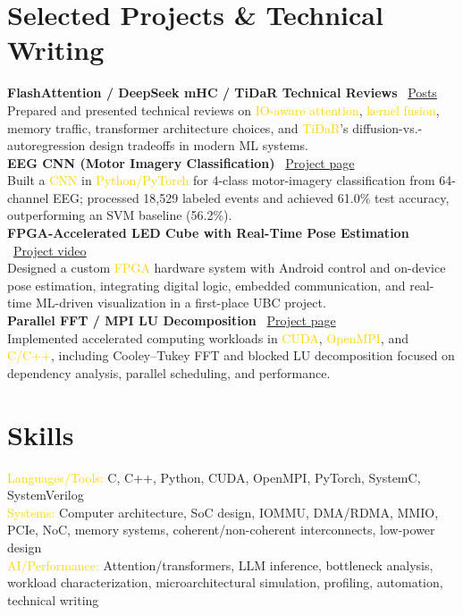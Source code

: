 \documentclass[11pt]{article}
\newcommand{\gold}[1]{\textcolor{gold}{#1}}
\begin{document}
\section{Selected Projects \& Technical Writing}
\textbf{FlashAttention / DeepSeek mHC / TiDaR Technical Reviews} \textbar\ \href{https://mauer4.github.io/post/}{Posts}\\
Prepared and presented technical reviews on \gold{IO-aware attention}, \gold{kernel fusion}, memory traffic, transformer architecture choices, and \gold{TiDaR}'s diffusion-vs.-autoregression design tradeoffs in modern ML systems.\\
\textbf{EEG CNN (Motor Imagery Classification)} \textbar\ \href{https://mauer4.github.io/project/eeg_cnn/}{Project page}\\
Built a \gold{CNN} in \gold{Python/PyTorch} for 4-class motor-imagery classification from 64-channel EEG; processed 18,529 labeled events and achieved 61.0\% test accuracy, outperforming an SVM baseline (56.2\%).\\
\textbf{FPGA-Accelerated LED Cube with Real-Time Pose Estimation} \textbar\ \href{https://www.youtube.com/watch?v=kbrSmiwQhu4&ab_channel=AdinMauer}{Project video}\\
Designed a custom \gold{FPGA} hardware system with Android control and on-device pose estimation, integrating digital logic, embedded communication, and real-time ML-driven visualization in a first-place UBC project.\\
\textbf{Parallel FFT / MPI LU Decomposition} \textbar\ \href{https://mauer4.github.io/project/parallel_fft/}{Project page}\\
Implemented accelerated computing workloads in \gold{CUDA}, \gold{OpenMPI}, and \gold{C/C++}, including Cooley--Tukey FFT and blocked LU decomposition focused on dependency analysis, parallel scheduling, and performance.

\section{Skills}
\gold{Languages/Tools:} C, C++, Python, CUDA, OpenMPI, PyTorch, SystemC, SystemVerilog\\
\gold{Systems:} Computer architecture, SoC design, IOMMU, DMA/RDMA, MMIO, PCIe, NoC, memory systems, coherent/non-coherent interconnects, low-power design\\
\gold{AI/Performance:} Attention/transformers, LLM inference, bottleneck analysis, workload characterization, microarchitectural simulation, profiling, automation, technical writing
\end{document}
